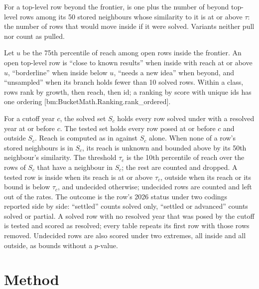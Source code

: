 \documentclass[11pt]{article}
\newcommand{\bm}[1]{\textcolor{bucketgray}{\footnotesize [bm:#1]}}
\begin{document}
\begin{definition}[Growth]
\label{def:growth}
For a top-level row beyond the frontier,  is one plus the number of beyond top-level rows among its 50 stored neighbours whose similarity to it is at or above $\tau$: the number of rows that would move inside if it were solved. Variants neither pull nor count as pulled.
\end{definition}

\begin{definition}
\label{def:class}
Let $u$ be the 75th percentile of reach among open rows inside the frontier. An open top-level row is \enquote{close to known results} when inside with reach at or above $u$, \enquote{borderline} when inside below $u$, \enquote{needs a new idea} when beyond, and \enquote{unsampled} when its branch holds fewer than 10 solved rows. Within a class, rows rank by growth, then reach, then id; a ranking by score with unique ids has one ordering \bm{BucketMath.Ranking.rank\_ordered}.
\end{definition}

\begin{definition}[Backtest]
\label{def:backtest}
For a cutoff year $c$, the solved set $S_c$ holds every row solved under  with a resolved year at or before $c$. The tested set holds every row posed at or before $c$ and outside $S_c$. Reach is computed as in  against $S_c$ alone. When none of a row's stored neighbours is in $S_c$, its reach is unknown and bounded above by its 50th neighbour's similarity. The threshold $\tau_c$ is the 10th percentile of reach over the rows of $S_c$ that have a neighbour in $S_c$; the rest are counted and dropped. A tested row is inside when its reach is at or above $\tau_c$, outside when its reach or its bound is below $\tau_c$, and undecided otherwise; undecided rows are counted and left out of the rates. The outcome is the row's 2026 status under two codings reported side by side: \enquote{settled} counts solved only, \enquote{settled or advanced} counts solved or partial. A solved row with no resolved year that was posed by the cutoff is tested and scored as resolved; every table repeats its first row with those rows removed. Undecided rows are also scored under two extremes, all inside and all outside, as bounds without a $p$-value.
\end{definition}

\section{Method}
\label{sec:method}
\end{document}

